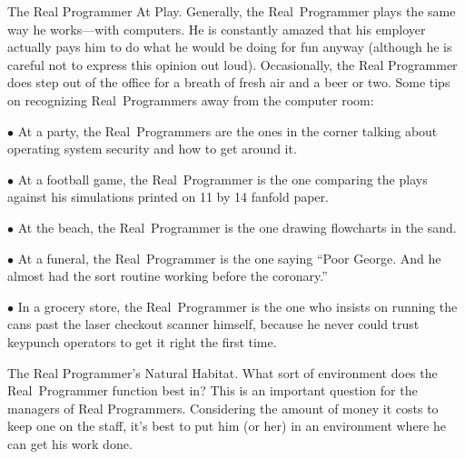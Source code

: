 \sect The Real Programmer At Play.
Generally, the Real~Programmer plays the same way he works---with
computers. He is constantly amazed that his employer actually pays him
to do what he would be doing for fun anyway (although he is careful
not to express this opinion out loud). Occasionally, the Real
Programmer does step out of the office for a breath of fresh air and a
beer or two. Some tips on recognizing Real~Programmers away from the
computer room:
\startlist
\item{$\bullet$} At a party, the Real~Programmers are the ones in the corner talking about operating system security and how to get around it.
\item{$\bullet$} At a football game, the Real~Programmer is the one comparing the plays against his simulations printed on 11 by 14 fanfold paper.
\item{$\bullet$} At the beach, the Real~Programmer is the one drawing flowcharts in the sand.
\item{$\bullet$} At a funeral, the Real~Programmer is the one saying ``Poor George. And he almost had the sort routine working before the coronary.''
\item{$\bullet$} In a grocery store, the Real~Programmer is the one who insists on running the cans past the laser checkout scanner himself, because he never could trust keypunch operators to get it right the first time.
\endlist

\sect The Real Programmer's Natural Habitat.
What sort of environment does the Real~Programmer function best in?
This is an important question for the managers of Real
Programmers. Considering the amount of money it costs to keep one on
the staff, it's best to put him (or her) in an environment where he
can get his work done.

